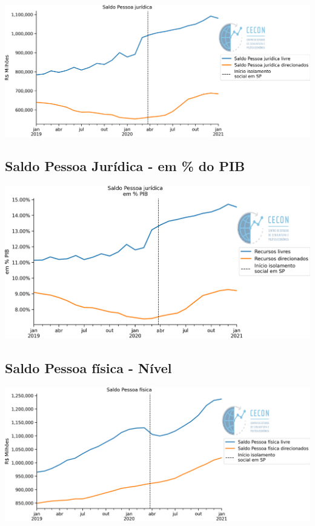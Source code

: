 \documentclass{SelfArx}
\begin{document}
\begin{center}
\includegraphics[width=.9\linewidth]{./figs/Credito/SaldoPJ.png}
\end{center}



\subsection*{Saldo Pessoa Jurídica - em \% do PIB}
\label{sec:org1eefe44}
\begin{center}
\includegraphics[width=.9\linewidth]{./figs/Credito/SaldoPJ_PIB.png}
\end{center}

\subsection*{Saldo Pessoa física - Nível}
\label{sec:org81979b2}

\begin{center}
\includegraphics[width=.9\linewidth]{./figs/Credito/SaldoPF.png}
\end{center}
\end{document}
